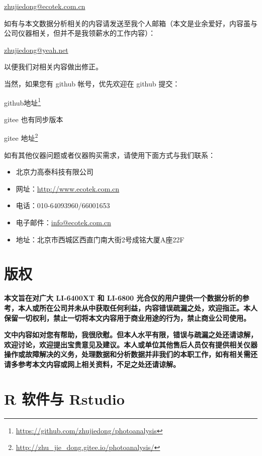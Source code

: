 \documentclass[
]{krantz}
\renewcommand{\href}[2]{#2\footnote{\url{#1}}}
\begin{document}
\url{zhujiedong@ecotek.com.cn}

如有与本文数据分析相关的内容请发送至我个人邮箱（本文是业余爱好，内容虽与公司仪器相关，但并不是我领薪水的工作内容）：

\url{zhujiedong@yeah.net}

以便我们对相关内容做出修正。

当然，如果您有 github 帐号，优先欢迎在 github 提交：

\href{https://github.com/zhujiedong/photoanalysis}{github地址}

gitee 也有同步版本

\href{http://zhu_jie_dong.gitee.io/photoanalysis/}{gitee 地址}

如有其他仪器问题或者仪器购买需求，请使用下面方式与我们联系：

\begin{itemize}
\item
  北京力高泰科技有限公司
\item
  网址：\url{http://www.ecotek.com.cn}
\item
  电话：010-64093960/66001653
\item
  电子邮件：\url{info@ecotek.com.cn}
\item
  地址：北京市西城区西直门南大街2号成铭大厦A座22F
\end{itemize}

\hypertarget{copyright}{%
\chapter*{版权}\label{copyright}}


\textbf{本文旨在对广大 LI-6400XT 和 LI-6800 光合仪的用户提供一个数据分析的参考，本人或所在公司并未从中获取任何利益，内容错误疏漏之处，欢迎指正。本人保留一切权利，禁止一切将本文内容用于商业用途的行为，禁止商业公司使用。}

\textbf{文中内容如对您有帮助，我很欣慰。但本人水平有限，错误与疏漏之处还请谅解，欢迎讨论，欢迎提出宝贵意见及建议。本人或单位其他售后人员仅有提供相关仪器操作或故障解决的义务，处理数据和分析数据并非我们的本职工作，如有相关需还请多参考本文内容或网上相关资料，不足之处还请谅解。}

\cleardoublepage

\mainmatter

\hypertarget{intro}{%
\chapter{R 软件与 Rstudio}\label{intro}}
\end{document}

